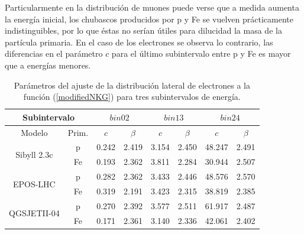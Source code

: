 Particularmente en la distribución de muones puede verse que a medida aumenta la energía inicial, los chubascos producidos por p y Fe se vuelven prácticamente indistinguibles, por lo que éstas no serían útiles para dilucidad la masa de la partícula primaria. En el caso de los electrones se observa lo contrario, las diferencias en el parámetro $c$ para el último subintervalo entre p y Fe es mayor que a energías menores. \\

\begin{table}[] 
\centering
\caption{Parámetros del ajuste de la distribución lateral de electrones a la función (\ref{modifiedNKG}) para tres subintervalos de energía.}
\begin{tabular}{cc|cc|cc|cc}
\hline
\multicolumn{2}{c|}{Subintervalo}                          & \multicolumn{2}{c|}{$bin02$} & \multicolumn{2}{c|}{$bin13$} & \multicolumn{2}{c}{$bin24$} \\ \hline
\multicolumn{1}{c|}{Modelo}                       & Prim. & $c$          & $\beta$       & $c$          & $\beta$       & $c$          & $\beta$       \\ \hline
\multicolumn{1}{c|}{\multirow{2}{*}{Sibyll 2.3c}} & p     & 0.242        & 2.419         & 3.154        & 2.450         & 48.247       & 2.491         \\
\multicolumn{1}{c|}{}                             & Fe    & 0.193        & 2.362         & 3.811        & 2.284         & 30.944       & 2.507         \\ \hline
\multicolumn{1}{c|}{\multirow{2}{*}{EPOS-LHC}}    & p     & 0.282        & 2.362         & 3.433        & 2.446         & 48.576       & 2.570         \\
\multicolumn{1}{c|}{}                             & Fe    & 0.319        & 2.191         & 3.423        & 2.315         & 38.819       & 2.385         \\ \hline
\multicolumn{1}{c|}{\multirow{2}{*}{QGSJETII-04}} & p     & 0.270        & 2.392         & 3.577        & 2.511         & 61.917       & 2.487         \\
\multicolumn{1}{c|}{}                             & Fe    & 0.171        & 2.361         & 3.140        & 2.336         & 42.061       & 2.402         \\ \hline
\end{tabular}
\label{edistlat_binparams}
\end{table}	 

